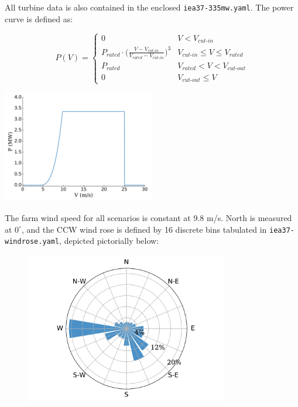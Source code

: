 \documentclass{article}
\begin{document}
        \noindent All turbine data is also contained in the enclosed \texttt{iea37-335mw.yaml}. The power curve is defined as:   

        \begin{minipage}{0.53\textwidth}
            \begin{equation*}
                P(V) = 
                \begin{cases} 
                    0 & V < V_{\textit{cut-in}} \\
                    P_{\textit{rated}}\cdot\bigg(\frac{V-V_{\textit{cut-in}}}{V_{\textit{rated}}-V_{\textit{cut-in}}}\bigg)^3 & V_{\textit{cut-in}}\leq V \leq V_{\textit{rated}} \\
                    P_{\textit{rated}} & V_{\textit{rated}} < V < V_{\textit{cut-out}} \\
                    0 & V_{\textit{cut-out}} \leq V
                \end{cases}
            \label{eq:power}
            \end{equation*}
        \end{minipage}\quad
        \begin{minipage}{0.53\textwidth}
            \includegraphics[width=2.6in]{iea37-335mw-pcurve}
        \end{minipage}

        The farm wind speed for all scenarios is constant at 9.8 m/s. North is measured at $0^{\circ}$, and the CCW wind rose is defined by 16 discrete bins tabulated in \texttt{iea37-windrose.yaml}, depicted pictorially below:
        \vspace{-1em}
        \begin{figure}[h!]
            \centering
            \includegraphics[width=3.5in]{iea37-windrose}
        \end{figure}
        \vspace{-2em}
\end{document}
